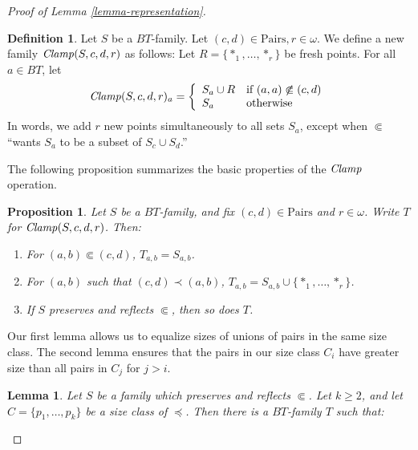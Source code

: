 \documentclass[letterpaper]{article} %
\newtheorem{lemma}[theorem]{Lemma}
\newtheorem{proposition}[theorem]{Proposition}
\theoremstyle{definition}
\newtheorem{definition}[theorem]{Definition}
\newcommand{\set}[1]{\{ #1 \}}
\newcommand{\Pairs}{\mbox{Pairs}}
\newcommand{\Clamp}{\protect{\mbox{\textit{Clamp}}}}
\newcommand{\precsubseteq}{\Subset}
\begin{document}
\begin{proof}[Proof of Lemma \ref{lemma-representation}]
\begin{definition}  Let $S$ be a $BT$-family.  Let $(c, d) \in \Pairs, r \in \omega$. 
We define a new family $\Clamp(S, c, d, r)$ as follows: 
Let $R = \set{*_1, \ldots, *_r}$ be fresh points.  For all $a \in BT$, let
\[ \begin{array}{lcl}
\Clamp(S,c,d,r)_a = \left\{
\begin{array}{ll}
S_a \cup R & \mbox{if $ (a,a) \not \precsubseteq (c,d)$}\\
 S_a & \mbox{otherwise}\\ 
 \end{array}
 \right.
\end{array}
\]
In words, we add $r$ new points
simultaneously to all sets $S_a$, except when 
$\precsubseteq$ ``wants 
$S_a$ to be a subset of  $S_c\cup S_d$.''

\end{definition}

The following proposition summarizes the basic properties
of the $\Clamp$ operation.  %
\begin{proposition}
Let $S$ be a $BT$-family, and fix $(c, d) \in \Pairs$ and $r \in \omega$.  Write $T$ for $\Clamp(S, c, d, r)$.  Then:

\begin{enumerate}
    \item For $(a,b)\precsubseteq (c,d)$, $T_{a,b} = S_{a,b}$. \label{part-easy}

    \item For $(a,b)$ such that $(c,d) \prec (a,b)$, $T_{a,b} =  S_{a,b}\cup\set{*_1,\ldots, *_r}$. \label{part-bigger}

    \item If $S$ preserves and reflects $\precsubseteq$, then so does $T$. \label{part-preserve}
\end{enumerate}

\label{proposition-sClamp}

\end{proposition}

Our first lemma allows us to equalize sizes of unions of pairs in the same size class.  The second lemma ensures that the pairs in our size class $C_i$ have greater size than all pairs in 
$C_j$ for $j > i$.

\begin{lemma}

Let $S$ be a family which preserves and reflects $\precsubseteq$.  Let $k\geq 2$, and let $C = \set{p_1, \ldots, p_k}$ be a size class of  $\preceq$.  Then there is a $BT$-family $T$ such that: 


\end{lemma}
\end{proof}
\end{document}
